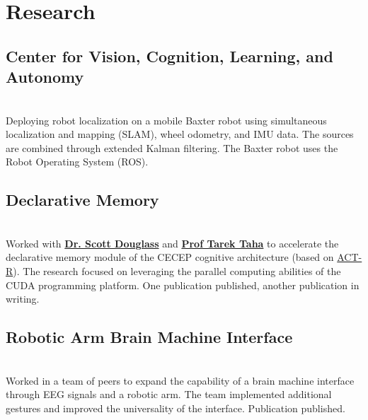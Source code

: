 \documentclass[letterpaper]{deedy-resume} %
\begin{document}
\begin{minipage}[t]{0.66\textwidth} %


\section{Research}

\subsection{Center for Vision, Cognition, Learning, and Autonomy}
 \hfill {} \\ 
\smallsectionspace
Deploying robot localization on a mobile Baxter robot using simultaneous localization and mapping (SLAM), wheel odometry, and IMU data. The sources are combined through extended Kalman filtering. The Baxter robot uses the Robot Operating System (ROS).

\sectionspace %


\subsection{Declarative Memory}
 \hfill {} \\
\smallsectionspace %
Worked with \textbf{\href{http://act-r.psy.cmu.edu/?post_type=authors&p=10523}{Dr. Scott Douglass}} and \textbf{\href{https://www.udayton.edu/directory/engineering/electrical_and_computer/taha_tarek_m.php}{Prof Tarek Taha}} to accelerate the declarative memory module of the CECEP cognitive architecture (based on \href{http://act-r.psy.cmu.edu/}{ACT-R}). The research focused on leveraging the parallel computing abilities of the CUDA programming platform. One publication published, another publication in writing.

\sectionspace %


\subsection{Robotic Arm Brain Machine Interface}
 \hfill {} \\
\smallsectionspace %
Worked in a team of peers to expand the capability of a brain machine interface through EEG signals and a robotic arm. The team implemented additional gestures and improved the universality of the interface. Publication published.



\end{minipage}
\end{document}
